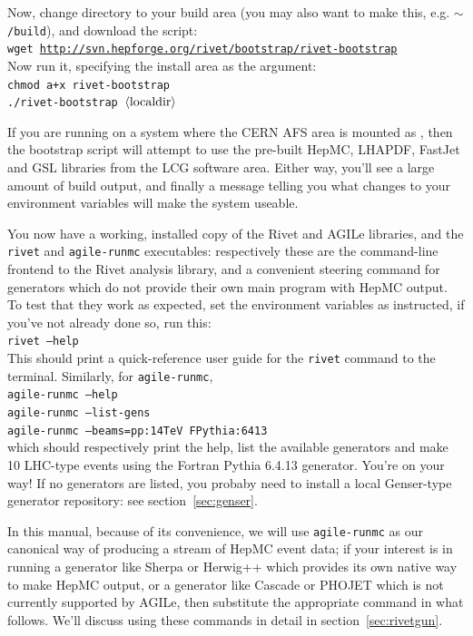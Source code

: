 \documentclass{JHEP3}
\newcommand{\kbd}[1]{\texttt{#1}\xspace}
\newcommand{\inp}[1]{\textsf{\textdollar}\hspace{1mm}\texttt{#1}\xspace}
\newcommand{\val}[1]{\textit{\ensuremath{\langle\text{\textrm{#1}\/}\rangle}}\xspace}
\newcommand{\home}{\texttt{\ensuremath{\sim}}\xspace}
\newcommand{\SectionRef}[1]{section~\ref{#1}}
\begin{document}
Now, change directory to your build area (you may also want to make this,
e.g. \kbd{\home/build}), and download the script:\\
\inp{wget \url{http://svn.hepforge.org/rivet/bootstrap/rivet-bootstrap}}\\
Now run it, specifying the install area as the argument:\\
\inp{chmod a+x rivet-bootstrap}\\
\inp{./rivet-bootstrap \val{localdir}}

If you are running on a system where the CERN AFS area is mounted as
, then the bootstrap script will attempt to use the pre-built
HepMC, LHAPDF, FastJet and GSL libraries from the LCG software area. Either way,
you'll see a large amount of build output, and finally a message telling you
what changes to your environment variables will make the system useable. 

You now have a working, installed copy of the Rivet and AGILe libraries, and the
\kbd{rivet} and \kbd{agile-runmc} executables: respectively these are the
command-line frontend to the Rivet analysis library, and a convenient steering
command for generators which do not provide their own main program with HepMC
output. To test that they work as expected, set the environment variables as
instructed, if you've not already done so, run this:\\
\inp{rivet --help}\\
This should print a quick-reference user guide for the \kbd{rivet} command to
the terminal. Similarly, for \kbd{agile-runmc},\\
\inp{agile-runmc --help}\\
\inp{agile-runmc --list-gens}\\
\inp{agile-runmc --beams=pp:14TeV FPythia:6413}\\
which should respectively print the help, list the available generators and make
10 LHC-type events using the Fortran Pythia 6.4.13 generator. You're on your
way! If no generators are listed, you probaby need to install a local
Genser-type generator repository: see \SectionRef{sec:genser}.

In this manual, because of its convenience, we will use \kbd{agile-runmc} as our
canonical way of producing a stream of HepMC event data; if your interest is in
running a generator like Sherpa or Herwig++ which provides its own native way to
make HepMC output, or a generator like Cascade or PHOJET which is not currently
supported by AGILe, then substitute the appropriate command in what
follows. We'll discuss using these commands in detail
in \SectionRef{sec:rivetgun}.
\end{document}
